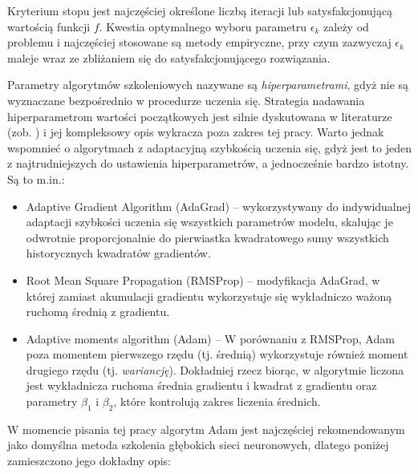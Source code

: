 Kryterium stopu jest najczęściej określone liczbą iteracji lub satysfakcjonującą wartością funkcji $f$. Kwestia optymalnego wyboru parametru $\epsilon_k$ zależy od problemu i najczęściej stosowane są metody empiryczne, przy czym zazwyczaj $\epsilon_k$ maleje wraz ze zbliżaniem się do satysfakcjonującego rozwiązania.

Parametry algorytmów szkoleniowych nazywane są \textit{hiperparametrami}, gdyż nie są wyznaczane bezpośrednio w procedurze uczenia się. Strategia nadawania hiperparametrom wartości początkowych jest silnie dyskutowana w literaturze (zob. \cite{Koch2017AutomatedHT}) i jej kompleksowy opis wykracza poza zakres tej pracy. Warto jednak wspomnieć o algorytmach z adaptacyjną szybkością uczenia się, gdyż jest to jeden z najtrudniejszych do ustawienia hiperparametrów, a jednocześnie bardzo istotny. Są to m.in.:
\begin{itemize}
 \item Adaptive Gradient Algorithm (AdaGrad) \cite{Duchi:2011:ASM:1953048.2021068} -- wykorzystywany do indywidualnej adaptacji szybkości uczenia się wszystkich parametrów modelu, skalując je odwrotnie proporcjonalnie do pierwiastka kwadratowego sumy wszystkich historycznych kwadratów gradientów.
 \item Root Mean Square Propagation (RMSProp) \cite{SCHMIDHUBER201585} -- modyfikacja AdaGrad, w której zamiast akumulacji gradientu wykorzystuje się wykładniczo ważoną ruchomą średnią z gradientu.
 \item Adaptive moments algorithm (Adam) \cite{DBLP:journals/corr/KingmaB14} -- W porównaniu z RMSProp, Adam poza momentem pierwszego rzędu (tj. średnią) wykorzystuje również moment drugiego rzędu (tj. \textit{wariancję}). Dokładniej rzecz biorąc, w algorytmie liczona jest wykładnicza ruchoma średnia gradientu i kwadrat z gradientu oraz parametry $\beta_1$ i $\beta_2$, które kontrolują zakres liczenia średnich.
\end{itemize}
W momencie pisania tej pracy algorytm Adam jest najczęściej rekomendowanym jako domyślna metoda szkolenia głębokich sieci neuronowych, dlatego poniżej zamieszczono jego dokładny opis:

